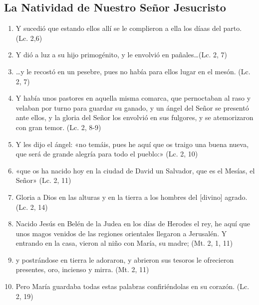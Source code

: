 \documentclass[a4paper,11pt]{article}
\begin{document}
    \subsection*{\hfil La Natividad de Nuestro Señor Jesucristo \hfil}
      
      \begin{enumerate}
        
        \item Y sucedió que estando ellos allí se le complieron a ella los díaas del parto. (Lc. 2,6)
        
        \item Y dió a luz a su hijo primogénito, y le envolvió en pañales\ldots (Lc. 2, 7)
        
        \item \ldots y le recostó en un pesebre, pues no había para ellos lugar en el mesón. (Lc. 2, 7)
        
        \item Y había unos pastores en aquella misma comarca, que pernoctaban al raso y velaban por turno para guardar su ganado, y un ángel
        del Señor se presentó ante ellos, y la gloria del Señor los envolvió en sus fulgores, y se atemorizaron con gran temor. (Lc. 2, 8-9)
        
        \item Y les dijo el ángel: «no temáis, pues he aquí que os traigo una buena nueva, que será de grande alegría para todo el pueblo:» (Lc. 2, 10)

        \item «que os ha nacido hoy en la ciudad de David un Salvador, que es el Mesías, el Señor» (Lc. 2, 11)
        
        \item Gloria a Dios en las alturas y en la tierra a los hombres del [divino] agrado. (Lc. 2, 14)

        \item Nacido Jesús en Belén de la Judea en los días de Herodes el rey, he aquí que unos magos venidos de las regiones orientales llegaron a Jerusalén.
        Y entrando en la casa, vieron al niño con María, su madre; (Mt. 2, 1, 11)
        
        \item y postrándose en tierra le adoraron, y abrieron sus tesoros le ofrecieron presentes, oro, incienso y mirra. (Mt. 2, 11)
        
        \item Pero María guardaba todas estas palabras confiriéndolas en su corazón. (Lc. 2, 19)

      \end{enumerate}
\end{document}
